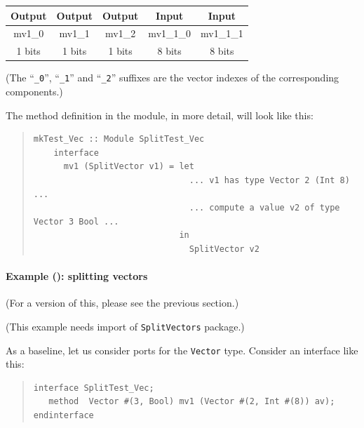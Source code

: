 \begin{center}
  \begin{tabular}{|c|c|c||c|c|}
    \hline
     Output &
     Output &
     Output &
     Input  &
     Input  \\
    \hline
     mv1\_0     &
     mv1\_1     &
     mv1\_2     &
     mv1\_1\_0  &
     mv1\_1\_1  \\
     1  bits   &
     1  bits   &
     1  bits   &
     8  bits   &
     8  bits   \\
    \hline
  \end{tabular}

  {\footnotesize (The ``{\tt \_0}'', ``{\tt \_1}'' and ``{\tt \_2}''
    suffixes are the vector indexes of the corresponding components.)}

\end{center}

The method definition in the module, in more detail, will look like this:

\begin{quote}
\begin{verbatim}
mkTest_Vec :: Module SplitTest_Vec
    interface
      mv1 (SplitVector v1) = let
                               ... v1 has type Vector 2 (Int 8) ...
                               ... compute a value v2 of type Vector 3 Bool ...
                             in
                               SplitVector v2
\end{verbatim}
\end{quote}


\paragraph{Example (\BSV): splitting vectors}

\label{sec:splitports_examples_BSV_vectors}

\hspace*{1em}

{\footnotesize (For a {\BHb} version of this, please see the previous section.)}

{\footnotesize (This example needs import of {\tt SplitVectors} package.)}

As a baseline, let us consider ports for the {\tt Vector} type.
Consider an interface like this:

\begin{quote}
\begin{verbatim}
interface SplitTest_Vec;
   method  Vector #(3, Bool) mv1 (Vector #(2, Int #(8)) av);
endinterface
\end{verbatim}
\end{quote}

